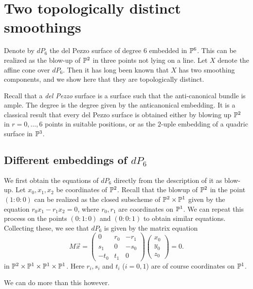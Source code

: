 
\chapter{Two topologically distinct smoothings}

Denote by $dP_6$ the del Pezzo surface of degree 6 embedded in $\mathbb{P}^6$. This can be realized as the blow-up of $\mathbb{P}^2$ in three points not lying on a line. Let $X$ denote the affine cone over $dP_6$. Then it has long been known that $X$ has two smoothing components, and we show here that they are topologically distinct.

Recall that a \emph{del Pezzo} surface is a surface such that the anti-canonical bundle is ample. The degree is the degree given by the anticanonical embedding. It is a classical result that every del Pezzo surface is obtained either by blowing up $\mathbb{P}^2$ in $r=0,\ldots,6$ points in suitable positions, or as the $2$-uple embedding of a quadric surface in $\mathbb{P}^3$. 

\section{Different embeddings of \texorpdfstring{$dP_6$}{dP6}}

We first obtain the equations of $dP_6$ directly from the description of it as blow-up. Let $x_0,x_1,x_2$ be coordinates of $\mathbb{P}^2$. Recall that the blowup of $\mathbb{P}^2$ in the point $(1:0:0)$ can be realized as the closed subscheme of $\mathbb{P}^2 \times \mathbb{P}^1$ given by the equation $r_0x_1-r_1x_2=0$, where $r_0,r_1$ are coordinates on $\mathbb{P}^1$. We can repeat this process on the points $(0:1:0)$ and $(0:0:1)$ to obtain similar equations. Collecting these, we see that $dP_6$ is given by the matrix equation
\[
M\vec x = 
\begin{pmatrix}
0 & r_0 & -r_1 \\
s_1 & 0 & -s_0 \\
-t_0 & t_1 & 0
\end{pmatrix}
\begin{pmatrix}
x_0 \\ y_0 \\ z_0
\end{pmatrix}= 0.
\]
in $\mathbb{P}^2 \times \mathbb{P}^1 \times \mathbb{P}^1 \times \mathbb{P}^1$. Here $r_i,s_i$ and $t_i$ ($i=0,1$) are of course coordinates on $\mathbb{P}^1$.

We can do more than this however. 

